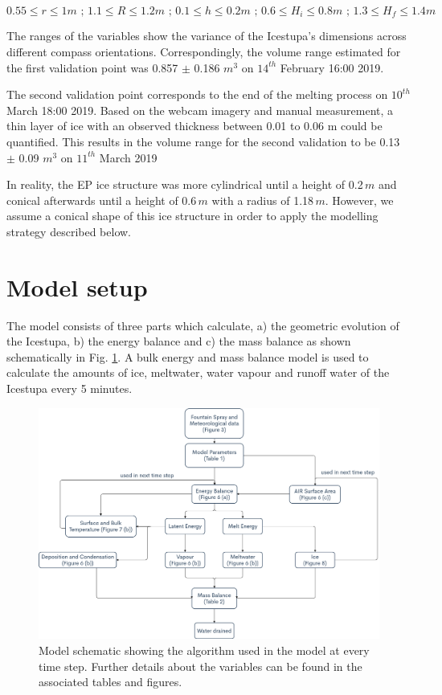 \documentclass[utf8]{frontiersSCNS} %
\begin{document}
$$ 0.55\leq r\leq 1 m\textit{ ; }1.1\leq R\leq 1.2 m\textit{ ; }0.1\leq h\leq 0.2 m\textit{ ; }0.6\leq
H_i\leq 0.8 m\textit{ ; }1.3\leq H_f\leq 1.4 m  $$

The ranges of the variables show the variance of the Icestupa's dimensions across different compass orientations.
Correspondingly, the volume range estimated for the first validation point was 0.857 $\pm$ 0.186 $m^{3}$ on $14^{th}$
February 16:00 2019.

The second validation point corresponds to the end of the melting process on $10^{th}$ March 18:00 2019.  Based on the
webcam imagery and manual measurement, a thin layer of ice with an observed thickness between 0.01 to 0.06 m could be
quantified. This results in the volume range for the second validation to be 0.13 $\pm$ 0.09 $m^{3}$ on $11^{th}$ March
2019 

In reality, the EP ice structure was more cylindrical until a height of 0.2\,$m$ and conical afterwards until a
height of 0.6\,$m$ with a radius of 1.18\,$m$. However, we assume a conical shape of this ice structure in order to
apply the modelling strategy described below.

\section{Model setup}

The model consists of three parts which calculate, a) the geometric evolution of the Icestupa, b) the energy balance
and c) the mass balance as shown schematically in Fig. \ref{fig:schema}. A bulk energy and mass balance model is used
to calculate the amounts of ice, meltwater, water vapour and runoff water of the Icestupa every 5 minutes. 

  \begin{figure} \begin{center} \includegraphics[width=15 cm]{Figures/Figure_4.jpg} \end{center} \caption{Model
schematic showing the algorithm used in the model at every time step. Further details about the variables can be
found in the associated tables and figures.} \label{fig:schema} \end{figure}
\end{document}
